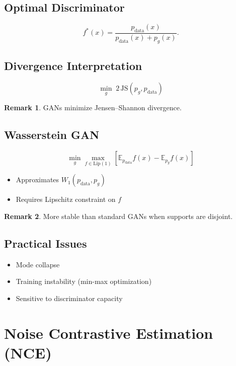 \documentclass[12pt,oneside]{book}
\numberwithin{equation}{section}
\theoremstyle{definition}
\newtheorem{remark}{Remark}[section]
\theoremstyle{plain}
\theoremstyle{remark}
\begin{document}
\subsection{Optimal Discriminator}

\[
f^*(x) = \frac{p_{\text{data}}(x)}{p_{\text{data}}(x) + p_g(x)}.
\]

\subsection{Divergence Interpretation}

\[
\min_g \; 2\,\mathrm{JS}(p_g, p_{\text{data}})
\]

\begin{remark}
GANs minimize Jensen--Shannon divergence.
\end{remark}

\subsection{Wasserstein GAN}

\[
\min_g \max_{f \in \text{Lip}(1)} 
\left[
\mathbb{E}_{p_{\text{data}}} f(x) - \mathbb{E}_{p_g} f(x)
\right]
\]

\begin{itemize}
    \item Approximates $W_1(p_{\text{data}}, p_g)$
    \item Requires Lipschitz constraint on $f$
\end{itemize}

\begin{remark}
More stable than standard GANs when supports are disjoint.
\end{remark}

\subsection{Practical Issues}

\begin{itemize}
    \item Mode collapse
    \item Training instability (min-max optimization)
    \item Sensitive to discriminator capacity
\end{itemize}

\section{Noise Contrastive Estimation (NCE)}
\end{document}
